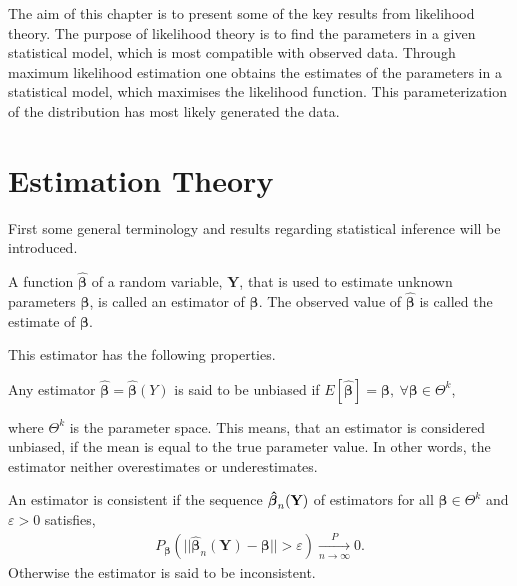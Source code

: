 The aim of this chapter is to present some of the key results from likelihood theory. 
The purpose of likelihood theory is to find the parameters in a given statistical model, which is most compatible with observed data. 
Through maximum likelihood estimation one obtains the estimates of the parameters in a statistical model, which maximises the likelihood function. 
This parameterization of the distribution has most likely generated the data.

\section{Estimation Theory}

First some general terminology and results regarding statistical inference will be introduced.

\begin{definition} 
    A function $\boldsymbol{\hat{\beta}}$ of a random variable, $\textbf{Y}$, that is used to estimate unknown parameters $\boldsymbol{\beta}$, is called an estimator of $\boldsymbol{\beta}$. The observed value of $\boldsymbol{\hat{\beta}}$ is called the estimate of $\boldsymbol{\beta}$.
\end{definition}

This estimator has the following properties. 

\begin{definition}
\label{def:Unbiased_estmator}
Any estimator $\boldsymbol{\hat{\beta}} = \boldsymbol{\hat{\beta}}(Y)$ is said to be unbiased if $E[\boldsymbol{\hat{\beta}}] = \boldsymbol{\beta}, \ \forall \boldsymbol{\beta} \in \Theta^k$,
\end{definition}

where $\Theta^k$ is the parameter space. This means, that an estimator is considered unbiased, if the mean is equal to the true parameter value. 
In other words, the estimator neither overestimates or underestimates.

\begin{definition} 
\label{def:consistent_estimator}
An estimator is consistent if the sequence $\operatorname{\boldsymbol{\hat{\beta}}}_n(\textbf{Y})$ of estimators for all $\boldsymbol{\beta} \in \Theta^k$ and $\varepsilon > 0$ satisfies,
\begin{align*}
    P_{\boldsymbol{\beta}}(||\hat{\boldsymbol{\beta}}_n(\textbf{Y}) - \boldsymbol{\beta}|| > \varepsilon) \xrightarrow[n \rightarrow \infty]{P} 0.
\end{align*}
Otherwise the estimator is said to be inconsistent.
\end{definition}

